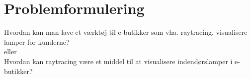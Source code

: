 \section{Problemformulering}
Hvordan kan man lave et værktøj til e-butikker som vha. raytracing, visualisere lamper for kunderne?
\\eller\\
Hvordan kan raytracing være et middel til at visualisere indendørslamper i e-butikker?